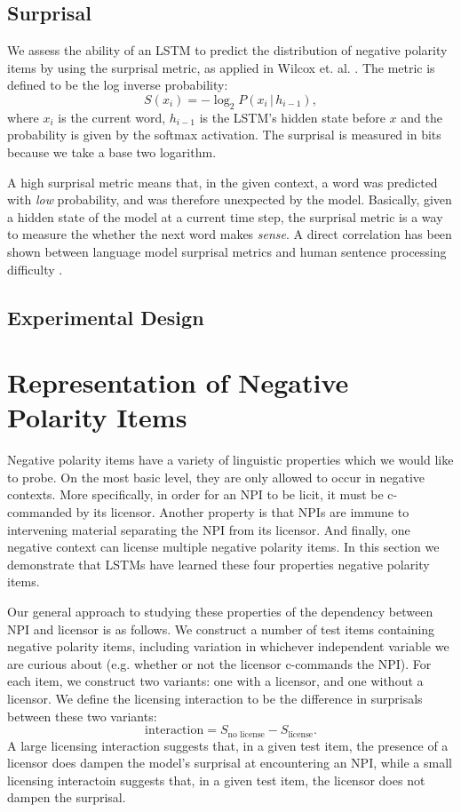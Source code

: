 \documentclass[11pt, round]{article}
\begin{document}
\subsection{Surprisal}

We assess the ability of an LSTM to predict the distribution of negative polarity items by using the surprisal metric, as applied in Wilcox et. al. . The metric is defined to be the log inverse probability:
\[ S(x_i) = -\log_2 P(x_i \, | \, h_{i-1}), \]
where $x_i$ is the current word, $h_{i-1}$ is the LSTM's hidden state before $x$ and the probability is given by the softmax activation. The surprisal is measured in bits because we take a base two logarithm.

A high surprisal metric means that, in the given context, a word was predicted with \textit{low} probability, and was therefore unexpected by the model. Basically, given a hidden state of the model at a current time step, the surprisal metric is a way to measure the whether the next word makes \textit{sense}. A direct correlation has been shown between language model surprisal metrics and  human sentence processing difficulty \cite{hale2001probabilistic,levy2008expectation,smith2013effect}. 

\subsection{Experimental Design}

\section{Representation of Negative Polarity Items}

Negative polarity items have a variety of linguistic properties which we would like to probe. On the most basic level, they are only allowed to occur in negative contexts. More specifically, in order for an NPI to be licit, it must be c-commanded by its licensor. Another property is that NPIs are immune to intervening material separating the NPI from its licensor. And finally, one negative context can license multiple negative polarity items. In this section we demonstrate that LSTMs have learned these four properties negative polarity items.

Our general approach to studying these properties of the dependency between NPI and licensor is as follows. We construct a number of test items containing negative polarity items, including variation in whichever independent variable we are curious about (e.g. whether or not the licensor c-commands the NPI). For each item, we construct two variants: one with a licensor, and one without a licensor. We define the licensing interaction to be the difference in surprisals between these two variants:
\[ \textrm{interaction} = S_{\textrm{no license}} - S_{\textrm{license}}. \]
A large licensing interaction suggests that, in a given test item, the presence of a licensor does dampen the model's surprisal at encountering an NPI, while a small licensing interactoin suggests that, in a given test item, the licensor does not dampen the surprisal.
\end{document}
